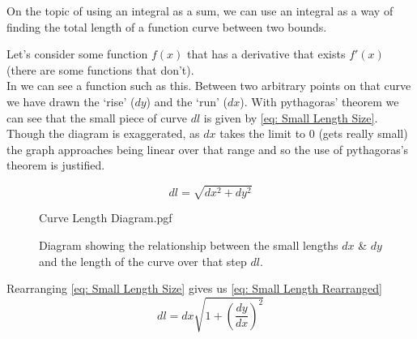 \documentclass[main.tex]{subfiles}
\begin{document}
                    On the topic of using an integral as a sum, we can use an integral as a way of finding the total length of a function curve between two bounds.

                    Let's consider some function $f(x)$ that has a derivative that exists $f'(x)$ (there are some functions that don't).\\
                    In  we can see a function such as this. Between two arbitrary points on that curve we have drawn the `rise' ($dy$) and the `run' ($dx$). With pythagoras' theorem we can see that the small piece of curve $dl$ is given by \eqref{eq: Small Length Size}.\\
                    Though the diagram is exaggerated, as $dx$ takes the limit to 0 (gets really small) the graph approaches being linear over that range and so the use of pythagoras's theorem is justified.
                    
                    \begin{equation}
                        dl = \sqrt{dx^2 + dy^2}
                        \label{eq: Small Length Size}
                    \end{equation}

                    \begin{figure}[h]
                        \centering
                        \scalebox{0.9}
                        {
                            \begin{adjustbox}{clip,trim=20mm 58mm 10mm 10mm}
                                {{Curve Length Diagram.pgf}}
                            \end{adjustbox}
                        }
                        \caption{Diagram showing the relationship between the small lengths $dx$ \& $dy$ and the length of the curve over that step $dl$. }
                        \label{fig: Curve Length Diagram}
                    \end{figure}
                    
                    Rearranging \eqref{eq: Small Length Size} gives us \eqref{eq: Small Length Rearranged}
                    \begin{equation}
                        dl = dx \sqrt{1 + \left(\frac{dy}{dx}\right)^2}
                        \label{eq: Small Length Rearranged}
                    \end{equation}
\end{document}
